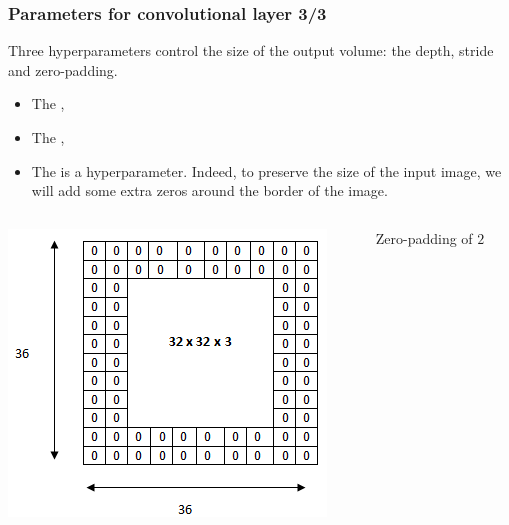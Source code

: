 \begin{frame}
	\frametitle{Parameters for convolutional layer 3/3}
	
	Three hyperparameters control the size of the output volume: the depth, stride and zero-padding.
	
	\begin{itemize}
		\item The ,
		
		\item The ,
		
		\item The  is a hyperparameter. Indeed, to preserve the size of the input image, we will add some extra zeros around the border of the image.
	\end{itemize}
	
		\begin{columns}[T] %
		\hspace{0.2cm}
			\begin{column}{.5\textwidth}
			\vspace{-0.5cm}
			\begin{center}
				\includegraphics[scale=0.5]{figs/pad}
			\end{center}
		\end{column}
	
	\begin{column}{.5\textwidth}
			\vspace{1.5cm}
			\hspace{1.5cm}
				Zero-padding of $2$
	\end{column}%
	\end{columns}
	
	
\end{frame}


